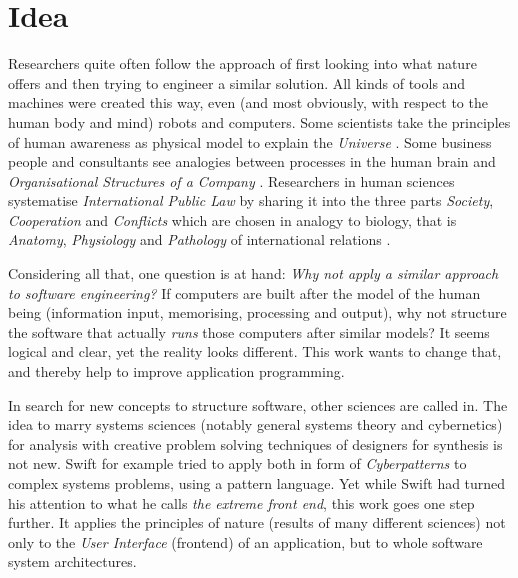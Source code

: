 %
%
%
%
%
%
%

\section{Idea}
\label{idea_heading}

Researchers quite often follow the approach of first looking into what nature
offers and then trying to engineer a similar solution. All kinds of tools and
machines were created this way, even (and most obviously, with respect to the
human body and mind) robots and computers. Some scientists take the principles
of human awareness as physical model to explain the \emph{Universe} \cite{ripota}.
Some business people and consultants see analogies between processes in the
human brain and \emph{Organisational Structures of a Company} \cite{schoenhofer}.
Researchers in human sciences systematise \emph{International Public Law} by
sharing it into the three parts \emph{Society}, \emph{Cooperation} and
\emph{Conflicts} which are chosen in analogy to biology, that is \emph{Anatomy},
\emph{Physiology} and \emph{Pathology} of international relations \cite{bierzanek}.

Considering all that, one question is at hand: \textit{Why not apply a similar
approach to software engineering?} If computers are built after the model of
the human being (information input, memorising, processing and output), why not
structure the software that actually \emph{runs} those computers after similar
models? It seems logical and clear, yet the reality looks different. This work
wants to change that, and thereby help to improve application programming.

In search for new concepts to structure software, other sciences are called in.
The idea to marry systems sciences (notably general systems theory and cybernetics)
for analysis with creative problem solving techniques of designers for synthesis
is not new. Swift \cite{designmatrix} for example tried to apply both in form of
\emph{Cyberpatterns} to complex systems problems, using a pattern language. Yet
while Swift had turned his attention to what he calls \textit{the extreme front
end}, this work goes one step further. It applies the principles of nature
(results of many different sciences) not only to the \emph{User Interface}
(frontend) of an application, but to whole software system architectures.

